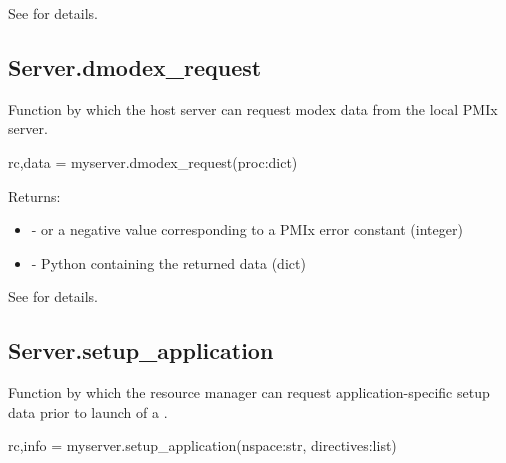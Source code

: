 See  for details.


\subsection{Server.dmodex_request}

\summary
Function by which the host server can request modex data from the local PMIx server.

\format

\pyspecificstart
\begin{codepar}
rc,data = myserver.dmodex_request(proc:dict)
\end{codepar}
\pyspecificend


\begin{arglist}
\end{arglist}

Returns:

\begin{itemize}
    \item {} -  or a negative value corresponding to a PMIx error constant (integer)
    \item {} - Python  containing the returned data (dict)
\end{itemize}

See  for details.


\subsection{Server.setup_application}

\summary
Function by which the resource manager can request application-specific setup data prior to launch of a .

\format

\pyspecificstart
\begin{codepar}
rc,info = myserver.setup_application(nspace:str, directives:list)
\end{codepar}
\pyspecificend


\begin{arglist}
\end{arglist}

